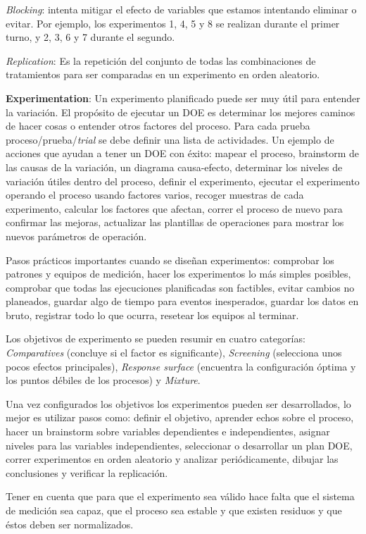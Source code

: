 \documentclass[]{article}
\begin{document}
\textit{Blocking}: intenta mitigar el efecto de variables que estamos intentando eliminar o evitar. Por ejemplo, los experimentos 1, 4, 5 y 8 se realizan durante el primer turno, y 2, 3, 6 y 7 durante el segundo.

\textit{Replication}: Es la repetición del conjunto de todas las combinaciones de tratamientos para ser comparadas en un experimento en orden aleatorio.

\textbf{Experimentation}: Un experimento planificado puede ser muy útil para entender la variación. El propósito de ejecutar un DOE es determinar los mejores caminos de hacer cosas o entender otros factores del proceso. Para cada prueba proceso/prueba/\textit{trial} se debe definir una lista de actividades. Un ejemplo de acciones que ayudan a tener un DOE con éxito: mapear el proceso, brainstorm de las causas de la variación, un diagrama causa-efecto, determinar los niveles de variación útiles dentro del proceso, definir el experimento, ejecutar el experimento operando el proceso usando factores varios, recoger muestras de cada experimento, calcular los factores que afectan, correr el proceso de nuevo para confirmar las mejoras, actualizar las plantillas de operaciones para mostrar los nuevos parámetros de operación.

Pasos prácticos importantes cuando se diseñan experimentos: comprobar los patrones y equipos de medición, hacer los experimentos lo más simples posibles, comprobar que todas las ejecuciones planificadas son factibles, evitar cambios no planeados, guardar algo de tiempo para eventos inesperados, guardar los datos en bruto, registrar todo lo que ocurra, resetear los equipos al terminar.

Los objetivos de experimento se pueden resumir en cuatro categorías: \textit{Comparatives} (concluye si el factor es significante), \textit{Screening} (selecciona unos pocos efectos principales), \textit{Response surface} (encuentra la configuración óptima y los puntos débiles de los procesos) y \textit{Mixture}.

Una vez configurados los objetivos los experimentos pueden ser desarrollados, lo mejor es utilizar pasos como: definir el objetivo, aprender echos sobre el proceso, hacer un brainstorm sobre variables dependientes e independientes, asignar niveles para las variables independientes, seleccionar o desarrollar un plan DOE, correr experimentos en orden aleatorio y analizar periódicamente, dibujar las conclusiones y verificar la replicación.

Tener en cuenta que para que el experimento sea válido hace falta que el sistema de medición sea capaz, que el proceso sea estable y que existen residuos y que éstos deben ser normalizados.
\end{document}
